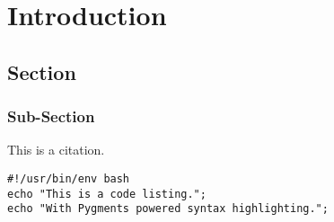 \chapter{Introduction}

\section{Section}

\subsection{Sub-Section}

This is a citation. \cite{hewitt1973universal}

\begin{verbatim}
#!/usr/bin/env bash
echo "This is a code listing.";
echo "With Pygments powered syntax highlighting.";
\end{verbatim}